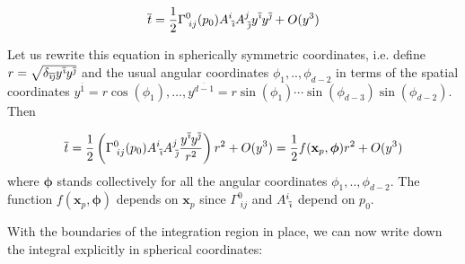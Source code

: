 \documentclass[12pt]{article}
\newcommand{\be}{\begin{equation}}
\newcommand{\ee}{\end{equation}}
\newcommand{\ibar}{{\overline{\emph\i}}}
\newcommand{\jbar}{{\overline{\emph\j}}}
\begin{document}
\be\label{eq:BottomSurface}
\overline{t}=\frac{1}{2}\Gamma^{0}_{\;ij}(p_0)A^{i}_{\;\ibar}A^{j}_{\;\jbar}y^{\ibar} y^{\jbar}+O(y^3)
\ee

Let us rewrite this equation in spherically symmetric coordinates, i.e. define $r=\sqrt{\delta_{\ibar\jbar}y^\ibar y^\jbar}$ and the usual angular coordinates $\phi_1,..,\phi_{d-2}$ in terms of the spatial coordinates $y^{\overline{1}} = r \cos(\phi_1),\ldots, y^{\overline{d-1}} = r \sin(\phi_1) \cdots \sin(\phi_{d-3}) \sin(\phi_{d-2})$. Then

\be\label{eq:RadialBottomSurface}
\overline{t}=\frac{1}{2}\left(\Gamma^{0}_{\;ij}(p_0)A^{i}_{\;\ibar}A^{j}_{\;\jbar}\frac{y^{\ibar} y^{\jbar}}{r^2}\right)r^2+O(y^3)=\frac{1}{2}f(\mathbf{x}_p,{\boldsymbol\phi})r^2+O(y^3)
\ee
where $\boldsymbol\phi$ stands collectively for all the angular coordinates $\phi_1,..,\phi_{d-2}$. The function $f(\mathbf{x}_p,\boldsymbol\phi)$ depends on $\mathbf{x}_p$ since $\Gamma^{0}_{\;ij}$ and $A^{i}_{\;\ibar}$ depend on $p_0$.

With the boundaries of the integration region in place, we can now write down the integral explicitly in spherical coordinates:
\end{document}
